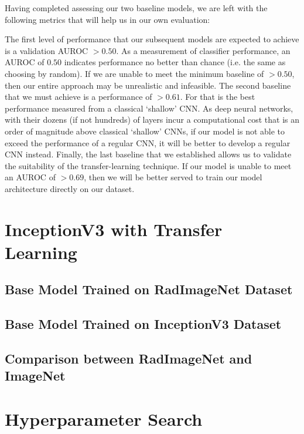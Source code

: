 Having completed assessing our two baseline models, we are left with the following metrics that will help us in our own evaluation:



\noindent
The first level of performance that our subsequent models are expected to achieve is a validation AUROC \(> 0.50\). As a measurement of classifier performance, an AUROC of \(0.50\) indicates performance no better than chance (i.e. the same as choosing by random). If we are unable to meet the minimum baseline of \(> 0.50\), then our entire approach may be unrealistic and infeasible. The second baseline that we must achieve is a performance of \(> 0.61\). For that is the best performance measured from a classical \enquote*{shallow} CNN. As deep neural networks, with their dozens (if not hundreds) of layers incur a computational cost that is an order of magnitude above classical \enquote*{shallow} CNNs, if our model is not able to exceed the performance of a regular CNN, it will be better to develop a regular CNN instead. Finally, the last baseline that we established allows us to validate the suitability of the transfer-learning technique. If our model is unable to meet an AUROC of \(> 0.69\), then we will be better served to train our model architecture directly on our dataset.

\section{InceptionV3 with Transfer Learning}

\subsection{Base Model Trained on RadImageNet Dataset}



\subsection{Base Model Trained on InceptionV3 Dataset}



\subsection{Comparison between RadImageNet and ImageNet}

\section{Hyperparameter Search}


